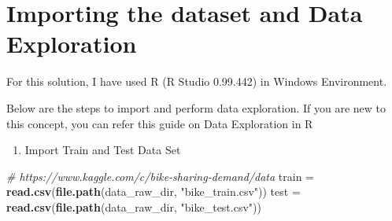\documentclass[]{book}
\newenvironment{Shaded}{\begin{snugshade}}{\end{snugshade}}
\newcommand{\CommentTok}[1]{\textcolor[rgb]{0.56,0.35,0.01}{\textit{#1}}}
\newcommand{\KeywordTok}[1]{\textcolor[rgb]{0.13,0.29,0.53}{\textbf{#1}}}
\newcommand{\NormalTok}[1]{#1}
\newcommand{\StringTok}[1]{\textcolor[rgb]{0.31,0.60,0.02}{#1}}
\providecommand{\tightlist}{%
  \setlength{\itemsep}{0pt}\setlength{\parskip}{0pt}}
\begin{document}
\hypertarget{importing-the-dataset-and-data-exploration}{%
\section{Importing the dataset and Data Exploration}\label{importing-the-dataset-and-data-exploration}}

For this solution, I have used R (R Studio 0.99.442) in Windows Environment.

Below are the steps to import and perform data exploration. If you are new to this concept, you can refer this guide on Data Exploration in R

\begin{enumerate}
\def\labelenumi{\arabic{enumi}.}
\tightlist
\item
  Import Train and Test Data Set
\end{enumerate}

\begin{Shaded}
\begin{Highlighting}[]
\CommentTok{# https://www.kaggle.com/c/bike-sharing-demand/data}
\NormalTok{train =}\StringTok{ }\KeywordTok{read.csv}\NormalTok{(}\KeywordTok{file.path}\NormalTok{(data_raw_dir, }\StringTok{"bike_train.csv"}\NormalTok{))}
\NormalTok{test =}\StringTok{ }\KeywordTok{read.csv}\NormalTok{(}\KeywordTok{file.path}\NormalTok{(data_raw_dir, }\StringTok{"bike_test.csv"}\NormalTok{))}
\end{Highlighting}
\end{Shaded}
\end{document}
